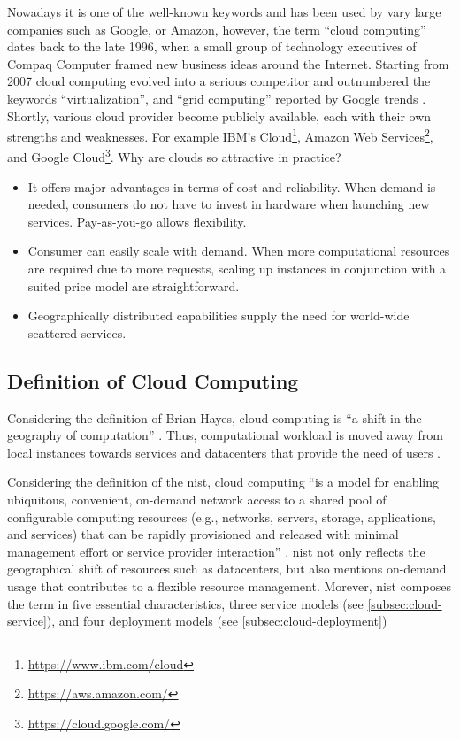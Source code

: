 Nowadays it is one of the well-known keywords and has been used by vary large companies such as Google, or Amazon, however, the term \enquote{cloud computing} dates back to the late 1996, when a small group of technology executives of Compaq Computer framed new business ideas around the Internet.\cite{regalado2020}
Starting from 2007 cloud computing evolved into a serious competitor and outnumbered the keywords \enquote{virtualization}, and \enquote{grid computing} reported by Google trends \cite{Wang2010}.
Shortly, various cloud provider become publicly available, each with their own strengths and weaknesses.
For example IBM's Cloud\footnote{\url{https://www.ibm.com/cloud}}, Amazon Web Services\footnote{\url{https://aws.amazon.com/}}, and Google Cloud\footnote{\url{https://cloud.google.com/}}.
Why are clouds so attractive in practice?

\begin{itemize}
    \item It offers major advantages in terms of cost and reliability.
    When demand is needed, consumers do not have to invest in hardware when launching new services.
    Pay-as-you-go allows flexibility.
    \item Consumer can easily scale with demand.
    When more computational resources are required due to more requests, scaling up instances in conjunction with a suited price model are straightforward.
    \item Geographically distributed capabilities supply the need for world-wide scattered services.
\end{itemize}

\subsection{Definition of Cloud Computing}

Considering the definition of Brian Hayes, cloud computing is \enquote{a shift in the geography of computation} \cite{hayes2008}.
Thus, computational workload is moved away from local instances towards services and datacenters that provide the need of users \cite{Armbrust2010}.

Considering the definition of the \ac{nist}, cloud computing \enquote{is a model for enabling ubiquitous, convenient, on-demand network access to a shared pool of configurable computing resources (e.g., networks, servers, storage, applications, and services) that can be rapidly provisioned and released with minimal management effort or service provider interaction} \cite{Mell2011}.
\ac{nist} not only reflects the geographical shift of resources such as datacenters, but also mentions on-demand usage that contributes to a flexible resource management.
Morever, \ac{nist} composes the term in five essential characteristics, three service models (see \autoref{subsec:cloud-service}), and four deployment models (see \autoref{subsec:cloud-deployment}) \cite{Mell2011}

